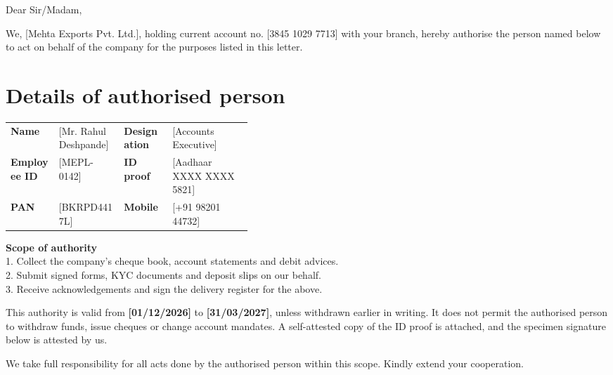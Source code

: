 \documentclass[10pt]{article}
\begin{document}
Dear Sir/Madam,\par\vspace{4pt}

We, [Mehta Exports Pvt. Ltd.], holding current account no. [3845 1029 7713] with your branch, hereby authorise the person named below to act on behalf of the company for the purposes listed in this letter.\par\vspace{4pt}

\section{Details of authorised person}

\begin{tabularx}{\linewidth}{@{}p{0.2\linewidth}X p{0.2\linewidth}X@{}}
\textbf{Name} & [Mr. Rahul Deshpande] & \textbf{Designation} & [Accounts Executive] \\
\textbf{Employee ID} & [MEPL-0142] & \textbf{ID proof} & [Aadhaar XXXX XXXX 5821] \\
\textbf{PAN} & [BKRPD4417L] & \textbf{Mobile} & [+91 98201 44732] \\
\end{tabularx}\par\vspace{2pt}

\noindent\colorbox{notebg}{\parbox{\dimexpr\linewidth-2\fboxsep}{\footnotesize {\color{accent}\bfseries Scope of authority}\\ 1. Collect the company's cheque book, account statements and debit advices.\\ 2. Submit signed forms, KYC documents and deposit slips on our behalf.\\ 3. Receive acknowledgements and sign the delivery register for the above.}}\par\vspace{6pt}

This authority is valid from \textbf{[01/12/2026]} to \textbf{[31/03/2027]}, unless withdrawn earlier in writing. It does not permit the authorised person to withdraw funds, issue cheques or change account mandates. A self-attested copy of the ID proof is attached, and the specimen signature below is attested by us.\par\vspace{4pt}

We take full responsibility for all acts done by the authorised person within this scope. Kindly extend your cooperation.\par\vspace{4pt}
\end{document}
